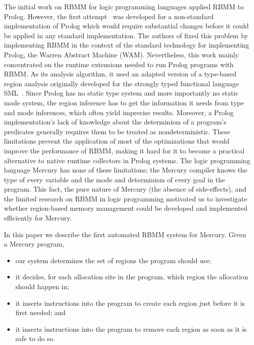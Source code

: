 \documentclass{tlp}
\begin{document}
The initial work on RBMM for logic programming languages
applied RBMM to Prolog.
However, the first attempt~\cite{Makholm00,Makholm00master}
was developed for a non-standard implementation of Prolog
which would require substantial changes
before it could be applied in any standard implementation.
The authors of \cite{MakholmSagonas02} fixed this problem by implementing RBMM
in the context of the standard technology for implementing Prolog,
the Warren Abstract Machine (WAM).
Nevertheless, this work mainly concentrated on
the runtime extensions needed to run Prolog programs with RBMM.
As its analysis algorithm, it used an adapted version
of a type-based region analysis originally developed
for the strongly typed functional language SML~\cite{Henglein01hmn}.
Since Prolog has no static type system
and more importantly no static mode system,
the region inference has to get the information it needs
from type and mode inferences, which often yield imprecise results.
Moreover, a Prolog implementation's lack of knowledge
about the determinism of a program's predicates
generally requires them to be treated as nondeterministic.
These limitations prevent the application of most of the optimizations
that would improve the performance of RBMM,
making it hard for it to become a practical alternative
to native runtime collectors in Prolog systems.
The logic programming language Mercury has none of these limitations;
the Mercury compiler knows the type of every variable
and the mode and determinism of every goal in the program.
This fact, the pure nature of Mercury (the absence of side-effects),
and the limited research on RBMM in logic programming
motivated us to investigate whether region-based memory management
could be developed and implemented efficiently for Mercury.

In this paper
we describe the first automated RBMM system for Mercury.
Given a Mercury program,
\begin{itemize}
\item
our system determines the set of regions the program should use;
\item
it decides, for each allocation site in the program,
which region the allocation should happen in;
\item
it inserts instructions into the program to create each region
just before it is first needed; and
\item
it inserts instructions into the program to remove each region
as soon as it is safe to do so.
\end{itemize}
\end{document}
